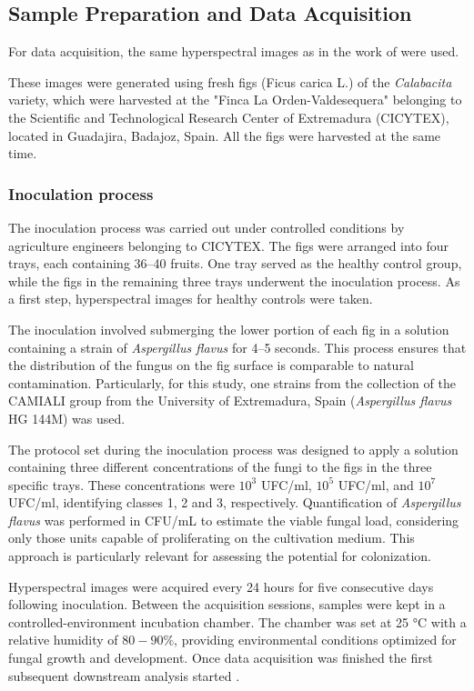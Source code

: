 \documentclass[ASNA,twocolumn]{USG}
\begin{document}
\subsection{Sample Preparation and Data Acquisition}

For data acquisition, the same hyperspectral images as in the work of \cite{cruz-carrasco_detection_2024} were used. 

These images were generated using fresh figs (Ficus carica L.) of the \textit{Calabacita} variety, which were harvested at the "Finca La Orden-Valdesequera" belonging to the Scientific and Technological Research Center of Extremadura (CICYTEX), located in Guadajira, Badajoz, Spain. All the figs were harvested at the same time.

\subsubsection{Inoculation process}
The inoculation process was carried out under controlled conditions by agriculture engineers belonging to CICYTEX. The figs were arranged into four trays, each containing 36--40 fruits. One tray served as the healthy control group, while the figs in the remaining three trays underwent the inoculation process. 
As a first step, hyperspectral images for healthy controls were taken.

The inoculation involved submerging the lower portion of each fig in a solution containing a strain of \textit{Aspergillus flavus} for 4--5 seconds. This process ensures that the distribution of the fungus on the fig surface is comparable to natural contamination. Particularly, for this study, one strains from the collection of the CAMIALI group from the University of Extremadura, Spain (\textit{Aspergillus flavus} HG 144M) was used.

The protocol set during the inoculation process was designed to apply a solution containing three different concentrations of the fungi to the figs in the three specific trays. These concentrations were $10^3$ UFC/ml,  $10^5$ UFC/ml, and $10^7$ UFC/ml, identifying classes 1, 2 and 3, respectively. Quantification of \textit{Aspergillus flavus} was performed in CFU/mL to estimate the viable fungal load, considering only those units capable of proliferating on the cultivation medium. This approach is particularly relevant for assessing the potential for colonization.

Hyperspectral images were acquired every 24 hours for five consecutive days following inoculation. Between the acquisition sessions, samples were kept in a controlled-environment incubation chamber. The chamber was set at 25 °C with a relative humidity of $80-90\%$, providing environmental conditions optimized for fungal growth and development. Once data acquisition was finished the first subsequent downstream analysis started \cite{cruz-carrasco_detection_2024}.
\end{document}

